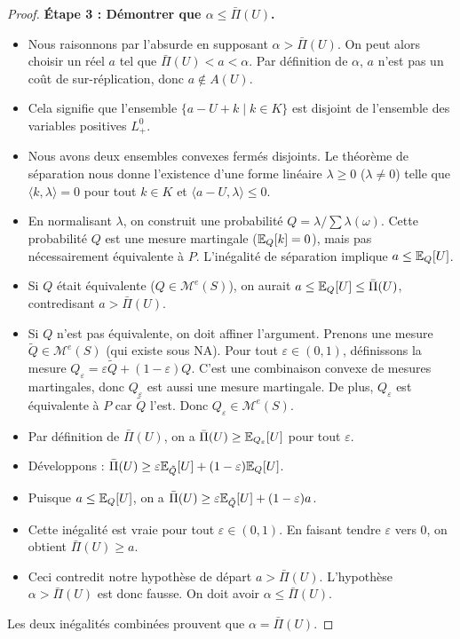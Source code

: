 \begin{proof}
\textbf{Étape 3 : Démontrer que $\alpha \le \bar\Pi(U)$.}
\begin{itemize}
    \item Nous raisonnons par l'absurde en supposant $\alpha > \bar\Pi(U)$. On peut alors choisir un réel $a$ tel que $\bar\Pi(U) < a < \alpha$. Par définition de $\alpha$, $a$ n'est pas un coût de sur-réplication, donc $a \notin A(U)$.
    \item Cela signifie que l'ensemble $\{a - U + k \mid k \in K\}$ est disjoint de l'ensemble des variables positives $L^0_+$.
    \item Nous avons deux ensembles convexes fermés disjoints. Le théorème de séparation nous donne l'existence d'une forme linéaire $\lambda \ge 0$ ($\lambda \neq 0$) telle que $\langle k, \lambda \rangle = 0$ pour tout $k \in K$ et $\langle a - U, \lambda \rangle \le 0$.
    \item En normalisant $\lambda$, on construit une probabilité $Q = \lambda / \sum \lambda(\omega)$. Cette probabilité $Q$ est une mesure martingale ($\mathbb{E}_Q[k]=0$), mais pas nécessairement équivalente à $P$. L'inégalité de séparation implique $a \le \mathbb{E}_Q[U]$.
    \item Si $Q$ était équivalente ($Q \in \mathcal{M}^e(S)$), on aurait $a \le \mathbb{E}_Q[U] \le \bar\Pi(U)$, contredisant $a > \bar\Pi(U)$.
    \item Si $Q$ n'est pas équivalente, on doit affiner l'argument. Prenons une mesure $\tilde{Q} \in \mathcal{M}^e(S)$ (qui existe sous NA). Pour tout $\varepsilon \in (0, 1)$, définissons la mesure $Q_\varepsilon = \varepsilon \tilde{Q} + (1-\varepsilon)Q$. C'est une combinaison convexe de mesures martingales, donc $Q_\varepsilon$ est aussi une mesure martingale. De plus, $Q_\varepsilon$ est équivalente à $P$ car $\tilde{Q}$ l'est. Donc $Q_\varepsilon \in \mathcal{M}^e(S)$.
    \item Par définition de $\bar\Pi(U)$, on a $\bar\Pi(U) \ge \mathbb{E}_{Q_\varepsilon}[U]$ pour tout $\varepsilon$.
    \item Développons : $\bar\Pi(U) \ge \varepsilon \mathbb{E}_{\tilde{Q}}[U] + (1-\varepsilon) \mathbb{E}_Q[U]$.
    \item Puisque $a \le \mathbb{E}_Q[U]$, on a $\bar\Pi(U) \ge \varepsilon \mathbb{E}_{\tilde{Q}}[U] + (1-\varepsilon)a$.
    \item Cette inégalité est vraie pour tout $\varepsilon \in (0, 1)$. En faisant tendre $\varepsilon$ vers 0, on obtient $\bar\Pi(U) \ge a$.
    \item Ceci contredit notre hypothèse de départ $a > \bar\Pi(U)$. L'hypothèse $\alpha > \bar\Pi(U)$ est donc fausse. On doit avoir $\alpha \le \bar\Pi(U)$.
\end{itemize}

Les deux inégalités combinées prouvent que $\alpha = \bar\Pi(U)$.
\end{proof}
